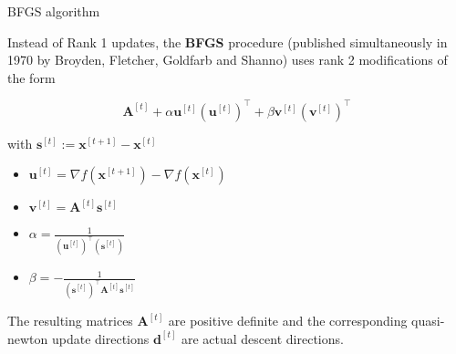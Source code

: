 \documentclass[11pt,compress,t,notes=noshow, xcolor=table]{beamer}
\begin{document}
\begin{vbframe}{BFGS algorithm}

Instead of Rank 1 updates, the \textbf{BFGS} procedure (published simultaneously in 1970 by Broyden, Fletcher, Goldfarb and Shanno) uses rank 2 modifications of the form

$$
\bm{A}^{[t]} + \alpha \bm{u}^{[t]}(\bm{u}^{[t]})^{\top} + \beta \bm{v}^{[t]}(\bm{v}^{[t]})^{\top}
$$

with $\bm{s}^{[t]} := \bm{x}^{[t+1]} - \bm{x}^{[t]}$

\begin{itemize}
  \item $\bm{u}^{[t]} = \nabla f(\bm{x}^{[t+1]}) - \nabla f(\bm{x}^{[t]})$
  \item $\bm{v}^{[t]} = \bm{A}^{[t]} \bm{s}^{[t]}$
  \item $\alpha = \frac{1}{(\bm{u}^{[t]})^\top (\bm{s}^{[t]})}$
  \item $\beta = - \frac{1}{(\bm{s}^{[t]})^\top \bm{A}^{[t]} \bm{s}^{[t]}}$
\end{itemize}

The resulting matrices $\bm{A}^{[t]}$ are positive definite and the corresponding quasi-newton update directions $\bm{d}^{[t]}$ are actual descent directions.



\end{vbframe}


\endlecture
\end{document}
